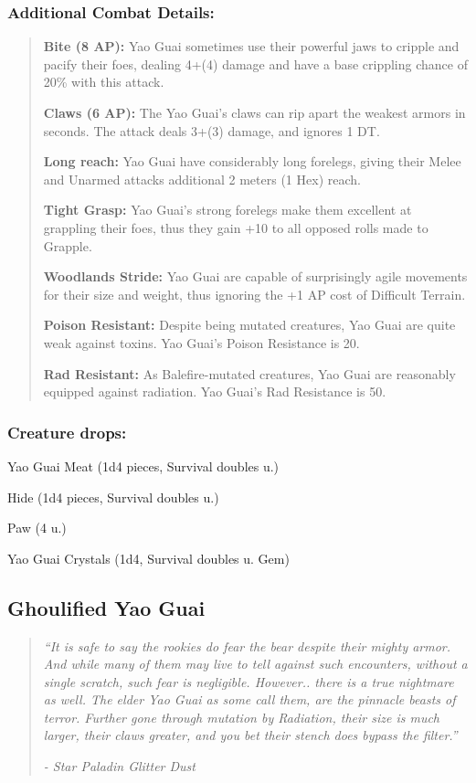 \documentclass[11pt,a4paper,twocolumn]{book}
\begin{document}
	\subsubsection*{Additional Combat Details:}
	\begin{verse}
		\textbf{Bite (8 AP):} Yao Guai sometimes use their powerful jaws to cripple and pacify their foes, dealing 4+(4) damage and have a base crippling chance of 20\% with this attack.
		
		\textbf{Claws (6 AP):} The Yao Guai's claws can rip apart the weakest armors in seconds. The attack deals 3+(3) damage, and ignores 1 DT.
		
		\textbf{Long reach:} Yao Guai have considerably long forelegs, giving their Melee and Unarmed attacks additional 2 meters (1 Hex) reach.
		
		\textbf{Tight Grasp:} Yao Guai's strong forelegs make them excellent at grappling their foes, thus they gain +10 to all opposed rolls made to Grapple.
		
		\textbf{Woodlands Stride:} Yao Guai are capable of surprisingly agile movements for their size and weight, thus ignoring the +1 AP cost of Difficult Terrain.
		
		\textbf{Poison Resistant:} Despite being mutated creatures, Yao Guai are quite weak against toxins. Yao Guai's Poison Resistance is 20.
		
		\textbf{Rad Resistant:} As Balefire-mutated creatures, Yao Guai are reasonably equipped against radiation. Yao Guai's Rad Resistance is 50.
	\end{verse}
	
	\subsubsection*{Creature drops:}
	\begin{compactitem}
		\item Yao Guai Meat (1d4 pieces, Survival doubles u.)
		\item Hide (1d4 pieces, Survival doubles u.)
		\item Paw (4 u.)
		\item Yao Guai Crystals (1d4, Survival doubles u. Gem)
	\end{compactitem}
	
	\subsection*{Ghoulified Yao Guai}
	\begin{quote}
		\emph{``It is safe to say the rookies do fear the bear despite their mighty armor. And while many of them may live to tell against such encounters, without a single scratch, such fear is negligible. However.. there is a true nightmare as well. The elder Yao Guai as some call them, are the pinnacle beasts of terror. Further gone through mutation by Radiation, their size is much larger, their claws greater, and you bet their stench does bypass the filter.''}
		
		\emph{-	Star Paladin Glitter Dust}
	\end{quote}
	
\end{document}
